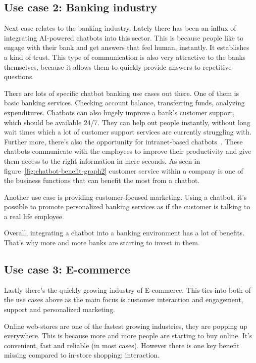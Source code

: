 \subsection{Use case 2: Banking industry}

Next case relates to the banking industry. Lately there has been an influx of integrating AI-powered chatbots into this sector. This is because people like to engage with their bank and get answers that feel human, instantly. It establishes a kind of trust. This type of communication is also very attractive to the banks themselves, because it allows them to quickly provide answers to repetitive questions.

There are lots of specific chatbot banking use cases out there. One of them is basic banking services. Checking account balance, transferring funds, analyzing expenditures. Chatbots can also hugely improve a bank's customer support, which should be available 24/7. They can help out people instantly, without long wait times which a lot of customer support services are currently struggling with. Further more, there's also the opportunity for intranet-based chatbots~\cite{intranet-chabot}. These chatbots communicate with the employees to improve their productivity and give them access to the right information in mere seconds. As seen in figure~\ref{fig:chatbot-benefit-graph2} customer service within a company is one of the business functions that can benefit the most from a chatbot.

Another use case is providing customer-focused marketing. Using a chatbot, it's possible to promote personalized banking services as if the customer is talking to a real life employee.

Overall, integrating a chatbot into a banking environment has a lot of benefits. That's why more and more banks are starting to invest in them.

\subsection{Use case 3: E-commerce}

Lastly there's the quickly growing industry of E-commerce. This ties into both of the use cases above as the main focus is customer interaction and engagement, support and personalized marketing.

Online web-stores are one of the fastest growing industries, they are popping up everywhere. This is because more and more people are starting to buy online. It's convenient, fast and reliable (in most cases). However there is one key benefit missing compared to in-store shopping: interaction.

